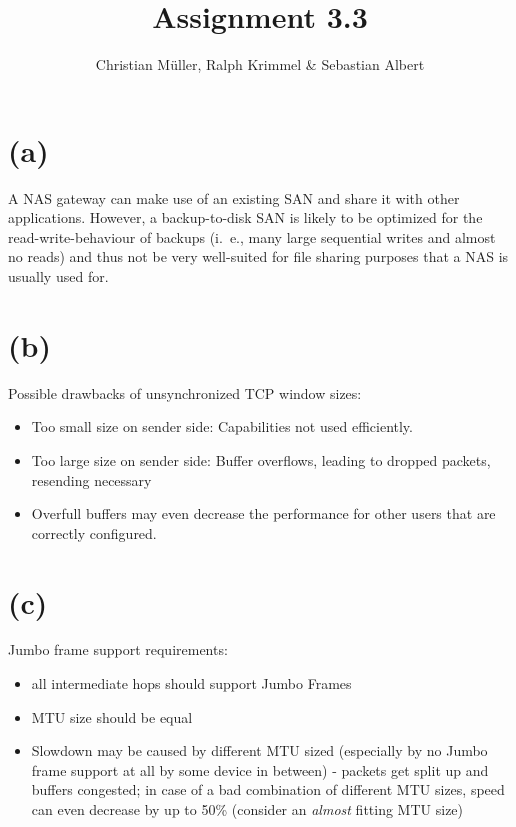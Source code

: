 \documentclass{article}
\begin{document}
\title{Assignment 3.3}
\author{Christian Müller, Ralph Krimmel \& Sebastian Albert}
\maketitle
\section*{(a)}
A NAS gateway can make use of an existing SAN and share it with other applications.
However, a backup-to-disk SAN is likely to be optimized for the read-write-behaviour of backups (i.~e., many large sequential writes and almost no reads) and thus not be very well-suited for file sharing purposes that a NAS is usually used for.
\section*{(b)}
Possible drawbacks of unsynchronized TCP window sizes:
\begin{itemize}
\item Too small size on sender side: Capabilities not used efficiently.
\item Too large size on sender side: Buffer overflows, leading to dropped packets, resending necessary
\item Overfull buffers may even decrease the performance for other users that are correctly configured.
\end{itemize}
\section*{(c)}
Jumbo frame support requirements:
\begin{itemize}
\item all intermediate hops should support Jumbo Frames
\item MTU size should be equal
\item Slowdown may be caused by different MTU sized (especially by no Jumbo frame support at all by some device in between) - packets get split up and buffers congested; in case of a bad combination of different MTU sizes, speed can even decrease by up to 50\% (consider an \emph{almost} fitting MTU size)
\end{itemize}
\end{document}
